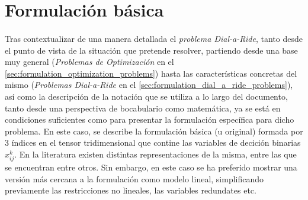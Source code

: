 \documentclass{subfiles}
\begin{document}
    \section{Formulación básica}
    \label{sec:formulation_basic_formulation}

      \paragraph{}
      Tras contextualizar de una manera detallada el \emph{problema Dial-a-Ride}, tanto desde el punto de vista de la situación que pretende resolver, partiendo desde una base muy general (\emph{Problemas de Optimización} en el \cref{sec:formulation_optimization_problems}) hasta las características concretas del mismo (\emph{Problemas Dial-a-Ride} en el \cref{sec:formulation_dial_a_ride_problems}), así como la descripción de la notación que se utiliza a lo largo del documento, tanto desde una perspectiva de bocabulario como matemática, ya se está en condiciones suficientes como para presentar la formulación específica para dicho problema. En este caso, se describe la formulación básica (u original) formada por 3 índices en el tensor tridimensional que contine las variables de decición binarias $x_{ij}^{k}$. En la literatura existen distintas representaciones de la misma, entre las que se encuentran \cite{cordeau2006branch,ropke2007models,cordeau2007dial} entre otros. Sin embargo, en este caso se ha preferido mostrar una versión más cercana a la formulación como modelo lineal, simplificando previamente las restricciones no lineales, las variables redundates etc.
\end{document}
